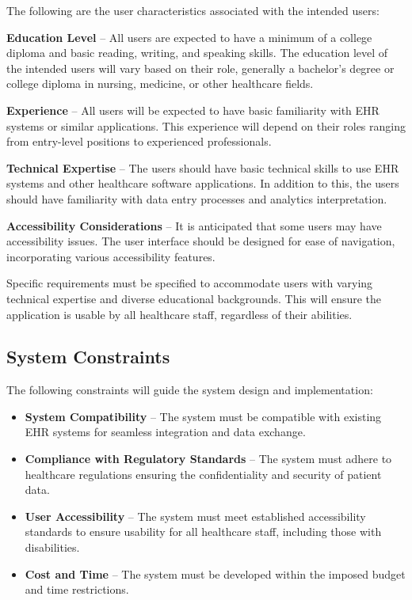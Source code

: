 \documentclass[12pt]{article}
\begin{document}
The following are the user characteristics associated with the intended users:

\textbf{Education Level} -- All users are expected to have a minimum of a college diploma and basic reading, writing, and speaking skills. The education level of the intended users will vary based on their role, generally a bachelor’s degree or college diploma in nursing, medicine, or other healthcare fields. 

\textbf{Experience} -- All users will be expected to have basic familiarity with EHR systems or similar applications. This experience will depend on their roles ranging from entry-level positions to experienced professionals. 

\textbf{Technical Expertise} -- The users should have basic technical skills to use EHR systems and other healthcare software applications. In addition to this, the users should have familiarity with data entry processes and analytics interpretation.

\textbf{Accessibility Considerations} -- It is anticipated that some users may have accessibility issues. The user interface should be designed for ease of navigation, incorporating various accessibility features.

Specific requirements must be specified to accommodate users with varying technical expertise and diverse educational backgrounds. This will ensure the application is usable by all healthcare staff, regardless of their abilities.


\subsection{System Constraints}

The following constraints will guide the system design and implementation:

\begin{itemize} 
  \item \textbf{System Compatibility} -- The system must be compatible with existing EHR systems for seamless integration and data exchange.

  \item \textbf{Compliance with Regulatory Standards} -- The system must adhere to healthcare regulations ensuring the confidentiality and security of patient data.

  \item \textbf{User Accessibility} -- The system must meet established accessibility standards to ensure usability for all healthcare staff, including those with disabilities.

  \item \textbf{Cost and Time} -- The system must be developed within the imposed budget and time restrictions.

\end{itemize}
\end{document}
